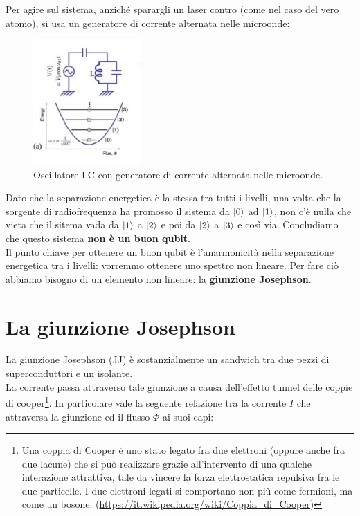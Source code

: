\documentclass[10pt,a4paper]{article}
\begin{document}
Per agire sul sistema, anziché sparargli un laser contro (come nel caso del vero atomo), si usa un generatore di corrente alternata nelle microonde:
\begin{figure}[h]
    \centering
    \includegraphics[width=0.37\textwidth]{LC_microwave.png}
    \caption{Oscillatore LC con generatore di corrente alternata nelle microonde.}
    \label{LC_microwave}
\end{figure}
\FloatBarrier

Dato che la separazione energetica è la stessa tra tutti i livelli, una volta che la sorgente di radiofrequenza ha promosso il sistema da $\ket{0}$ ad  $\ket{1}$, non c'è nulla che vieta che il sitema vada da  $\ket{1}$ a  $\ket{2}$ e poi da  $\ket{2}$ a  $\ket{3}$ e così via.
Concludiamo che questo sistema \textbf{non è un buon qubit}.\\

Il punto chiave per ottenere un buon qubit è l'anarmonicità nella separazione energetica tra i livelli: vorremmo ottenere uno spettro non lineare.
Per fare ciò abbiamo bisogno di un elemento non lineare: la \textbf{giunzione Josephson}.

\section{La giunzione Josephson}
La giunzione Josephson (JJ) è sostanzialmente un sandwich tra due pezzi di superconduttori e un isolante.\\
La corrente passa attraverso tale giunzione a causa dell'effetto tunnel delle coppie di cooper\footnote{Una coppia di Cooper è uno stato legato fra due elettroni (oppure anche fra due lacune) che si può realizzare grazie all'intervento di una qualche interazione attrattiva, tale da vincere la forza elettrostatica repulsiva fra le due particelle. I due elettroni legati si comportano non più come fermioni, ma come un bosone. (\url{https://it.wikipedia.org/wiki/Coppia_di_Cooper})}. In particolare vale la seguente relazione tra la corrente $I$ che attraversa la giunzione ed il flusso $\Phi$ ai suoi capi:
\end{document}

